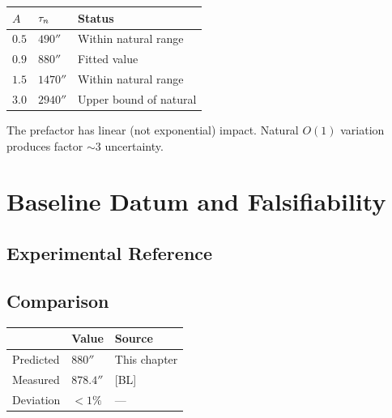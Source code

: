 \begin{center}
\begin{tabular}{lll}
\toprule
$A$ & $\tau_n$ & Status \\
\midrule
$0.5$ & $490\second$ & Within natural range \\
$0.9$ & $880\second$ & Fitted value \\
$1.5$ & $1470\second$ & Within natural range \\
$3.0$ & $2940\second$ & Upper bound of natural \\
\bottomrule
\end{tabular}
\end{center}

The prefactor has linear (not exponential) impact. Natural $O(1)$ variation
produces factor $\sim 3$ uncertainty.

\section{Baseline Datum and Falsifiability}
\label{sec:taun:falsify}

\subsection{Experimental Reference}

\begin{center}
\end{center}

\subsection{Comparison}

\begin{center}
\begin{tabular}{lll}
\toprule
& Value & Source \\
\midrule
Predicted & $880\second$ & This chapter \\
Measured & $878.4\second$ & [BL] \\
Deviation & $< 1\%$ & — \\
\bottomrule
\end{tabular}
\end{center}

